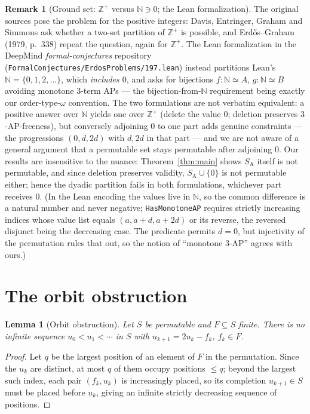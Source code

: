 \documentclass[11pt]{article}
\newtheorem{lemma}[theorem]{Lemma}
\theoremstyle{definition}
\newtheorem{remark}[theorem]{Remark}
\newcommand{\Z}{\mathbb{Z}}
\newcommand{\N}{\mathbb{N}}
\newcommand{\SA}{S_{\mathrm{A}}}
\begin{document}
\begin{remark}[Ground set: $\Z^+$ versus $\N \ni 0$; the Lean formalization]
\label{rem:lean}
The original sources pose the problem for the positive integers: Davis,
Entringer, Graham and Simmons ask whether a two-set partition of $\Z^+$ is
possible, and Erd\H{o}s--Graham (1979, p.~338) repeat the question, again
for $\Z^+$. The Lean formalization in the DeepMind
\emph{formal-conjectures} repository
(\texttt{FormalConjectures/ErdosProblems/197.lean}) instead partitions
Lean's $\N = \{0, 1, 2, \dots\}$, which \emph{includes $0$}, and asks for
bijections $f\colon \N \simeq A$, $g\colon \N \simeq B$ avoiding monotone
$3$-term APs --- the bijection-from-$\N$ requirement being exactly our
order-type-$\omega$ convention. The two formulations are not verbatim
equivalent: a positive answer over $\N$ yields one over $\Z^+$ (delete the
value $0$; deletion preserves $3$-AP-freeness), but conversely adjoining
$0$ to one part adds genuine constraints --- the progressions $(0, d, 2d)$
with $d, 2d$ in that part --- and we are not aware of a general argument
that a permutable set stays permutable after adjoining $0$. Our results
are insensitive to the nuance: Theorem~\ref{thm:main} shows $\SA$ itself
is not permutable, and since deletion preserves validity, $\SA \cup \{0\}$
is not permutable either; hence the dyadic partition fails in both
formulations, whichever part receives $0$. (In the Lean encoding the
values live in $\N$, so the common difference is a natural number and never
negative; \texttt{HasMonotoneAP} requires strictly increasing indices whose
value list equals $(a, a+d, a+2d)$ or its reverse, the reversed disjunct
being the decreasing case. The predicate permits $d = 0$, but injectivity
of the permutation rules that out, so the notion of ``monotone $3$-AP''
agrees with ours.)
\end{remark}

\section{The orbit obstruction}

\begin{lemma}[Orbit obstruction]\label{lem:orbit}
Let $S$ be permutable and $F \subseteq S$ finite. There is no infinite sequence
$u_0 < u_1 < \cdots$ in $S$ with $u_{k+1} = 2u_k - f_k$, $f_k \in F$.
\end{lemma}

\begin{proof}
Let $q$ be the largest position of an element of $F$ in the permutation. Since
the $u_k$ are distinct, at most $q$ of them occupy positions $\le q$; beyond the
largest such index, each pair $(f_k, u_k)$ is increasingly placed, so its
completion $u_{k+1} \in S$ must be placed before $u_k$, giving an infinite strictly
decreasing sequence of positions.
\end{proof}
\end{document}
